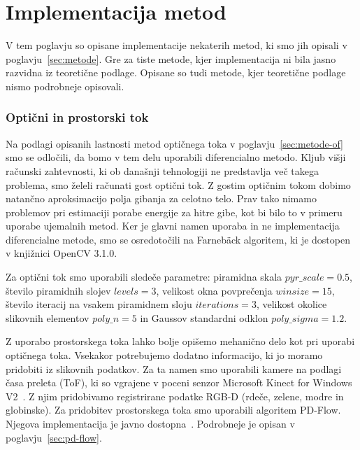 \chapter{Implementacija metod}
V tem poglavju so opisane implementacije nekaterih metod, ki smo jih opisali v poglavju~\ref{sec:metode}. Gre za tiste metode, kjer implementacija ni bila jasno razvidna iz teoretične podlage. Opisane so tudi metode, kjer teoretične podlage nismo podrobneje opisovali.

\subsection{Optični in prostorski tok}
Na podlagi opisanih lastnosti metod optičnega toka v poglavju~\ref{sec:metode-of} smo se odločili, da bomo v tem delu uporabili diferencialno metodo. Kljub višji računski zahtevnosti, ki ob današnji tehnologiji ne predstavlja več takega problema, smo želeli računati gost optični tok. Z gostim optičnim tokom dobimo natančno aproksimacijo polja gibanja za celotno telo. Prav tako nimamo problemov pri estimaciji porabe energije za hitre gibe, kot bi bilo to v primeru uporabe ujemalnih metod. Ker je glavni namen uporaba in ne implementacija diferencialne metode, smo se osredotočili na Farneb{\"a}ck algoritem, ki je dostopen v knjižnici OpenCV 3.1.0.

Za optični tok smo uporabili sledeče parametre: piramidna skala $pyr\_scale=\num{0.5}$, število piramidnih slojev $levels=3$, velikost okna povprečenja $winsize=15$, število iteracij na vsakem piramidnem sloju $iterations=3$, velikost okolice slikovnih elementov $poly\_n=5$ in Gaussov standardni odklon $poly\_sigma=\num{1.2}$.

Z uporabo prostorskega toka lahko bolje opišemo mehanično delo kot pri uporabi optičnega toka. Vsekakor potrebujemo dodatno informacijo, ki jo moramo pridobiti iz slikovnih podatkov. Za ta namen smo uporabili kamere na podlagi časa preleta (ToF), ki so vgrajene v poceni senzor Microsoft Kinect for Windows V2~\cite{Yang2015KinectV2}. Z njim pridobivamo registrirane podatke RGB-D (rdeče, zelene, modre in globinske). Za pridobitev prostorskega toka smo uporabili algoritem PD-Flow. Njegova implementacija je javno dostopna~\cite{jaimez2015primal}. Podrobneje je opisan v poglavju~\ref{sec:pd-flow}.



